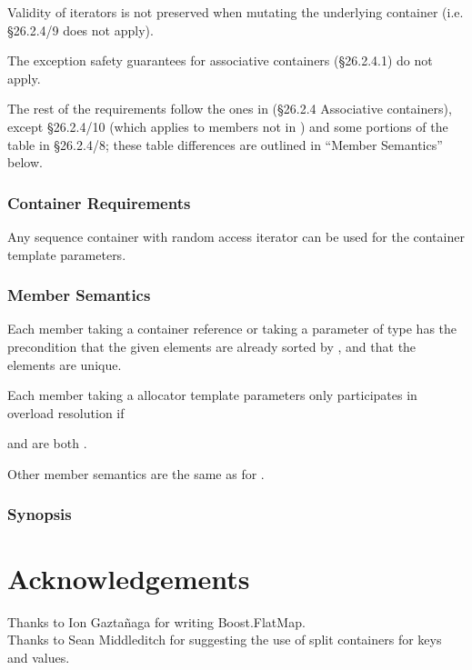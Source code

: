 Validity of iterators is not preserved when mutating the underlying container
(i.e. \S26.2.4/9 does not apply).

The exception safety guarantees for associative containers (\S26.2.4.1) do not
apply.

The rest of the requirements follow the ones in (\S26.2.4 Associative
containers), except \S26.2.4/10 (which applies to members not in
) and some portions of the table in \S26.2.4/8; these table
differences are outlined in ``Member Semantics'' below.

\subsubsection{Container Requirements}

Any sequence container with random access iterator can be used for the
container template parameters.

\subsubsection{Member Semantics}

Each member taking a container reference or taking a parameter of type
 has the precondition that the given
elements are already sorted by , and that the elements are
unique.

Each member taking a allocator template parameters only participates in
overload resolution if

 and
 are both .

Other member semantics are the same as for .

\subsubsection{ Synopsis}




\section{Acknowledgements}

Thanks to Ion Gazta\~{n}aga for writing Boost.FlatMap.\\

Thanks to Sean Middleditch for suggesting the use of split containers for keys
and values.
